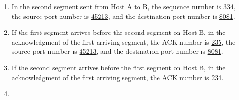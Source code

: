 \documentclass{report}
\begin{document}
\begin{problem}
\begin{answer}{33em}
\begin{enumerate}
  \item In the second segment sent from Host A to B, the sequence number is \underline{334}, the source port number is \underline{45213}, and the destination port number is \underline{8081}.
  \item If the first segment arrives before the second segment on Host B, in the acknowledgment of the first arriving segment, the ACK number is \underline{235}, the source port number is \underline{45213}, and the destination port number is \underline{8081}.
  \item If the second segment arrives before the first segment on Host B, in the acknowledgment of the first arriving segment, the ACK number is \underline{234}.
  \item 
\end{enumerate}
\end{answer}

\end{problem}
\end{document}
